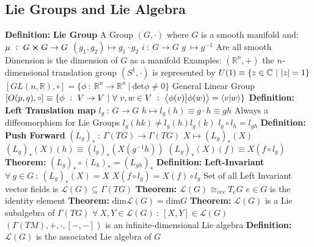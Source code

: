 \documentclass[14pt]{extarticle}
\def\Definition{{\color{blue} \textbf{Definition:} }}
\def\Theorem{{\color{red} \textbf{Theorem:} }}
\begin{document}
\begin{outline}
	\section*{Lie Groups and Lie Algebra}
		\1	\Definition \textbf{Lie Group}
			\2	A Group $(G,\cdot)$ where $G$ is a smooth manifold and:
				\3	$\mu~:~G \cross G \rightarrow G$
				\3	$(g_1,g_2) \mapsto g_1 \cdot g_2$
				\3	$i~:~G \rightarrow G$
				\3	$g~\mapsto g^{-1}$
				\3	Are all smooth
			\2	Dimension is the dimension of $G$ as a manifold
			\2	Examples:
				\3	$(\mathbb{R}^n,+)$ the $n$-dimensional translation group
				\3	$(S^1,\cdot)$ is represented by $U(1) \equiv \{z \in \mathbb{C}~|~\abs{z} = 1\}$
				\3	$[GL(n,\mathbb{R}),\circ] = \{\phi~:~\mathbb{R}^n \rightarrow 
							\mathbb{R}^n ~|~\text{det}\phi \ne 0\}$ General Linear Group
				\3	$[O(p,q),\circ] \equiv \{\phi~:~V \rightarrow V~|~
							\forall~v,w \in V~:~\braket{\phi(v)}{\phi(w)} = \braket{v}{w}\}$
		\1	\Definition \textbf{Left Translation map}
			\2	$l_g~:~G \rightarrow G$
			\2	$h \mapsto l_g(h) \equiv g \cdot h \equiv gh$
			\2	Always a diffeomorphism for Lie Groups
			\2	$l_g(hk) \ne l_g(h)l_g(k)$
			\2	$l_g \circ l_h = l_{gh}$
		\1	\Definition \textbf{Push Forward}
			\2	$(L_g)_*~:~\Gamma(TG) \rightarrow \Gamma(TG)$
			\2	$X \mapsto (L_g)_*(X)$
			\2	$(L_g)_*(X)(h) \equiv (l_g)_*(X(g^{-1}h))$
			\2	$(L_g)_*(X)(f) \equiv X(f \circ l_g)$
			\2	\Theorem $(L_g)_* \circ (L_h)_* = (L_{gh})_*$
		\1	\Definition \textbf{Left-Invariant}
			\2	$\forall~g \in G~:~(L_g)_*(X) = X$
			\2	$X(f \circ l_g) = X(f) \circ l_g$
			\2	Set of all Left Invariant vector fields is $\mathcal{L}(G) \subseteq \Gamma(TG)$
			\2	\Theorem $\mathcal{L}(G) \cong_{vec} T_eG$
				\3	$e \in G$ is the identity element
			\2	\Theorem $\text{dim}\mathcal{L}(G) = \text{dim} G$
			\2	\Theorem $\mathcal{L}(G)$ is a Lie subalgebra of $\Gamma(TG)$
				\3	$\forall~X,Y \in \mathcal{L}(G)~:~[X,Y] \in \mathcal{L}(G)$
				\3	$(\Gamma(TM),+,\cdot,[-,-])$ is an infinite-dimensional Lie algebra
			\2	\Definition $\mathcal{L}(G)$ is the associated Lie algebra of $G$

\end{outline}
\end{document}
